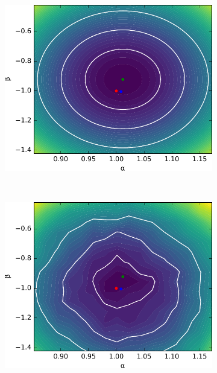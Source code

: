 \documentclass[12pt]{article}
\numberwithin{equation}{section}
\theoremstyle{plain}
\begin{document}
\begin{figure}
    \centering
    \begin{subfigure}[t]{0.45\textwidth}
        \centering
        \includegraphics[width=\textwidth]{figures/fig5a.pdf}
        \caption{  }
        \label{fig:5a}
    \end{subfigure}
    ~
    \begin{subfigure}[t]{0.45\textwidth}
        \centering
        \includegraphics[width=\textwidth]{figures/fig5b.pdf}
        \caption{ }
        \label{fig:5b}
    \end{subfigure}


\end{figure}
\end{document}
